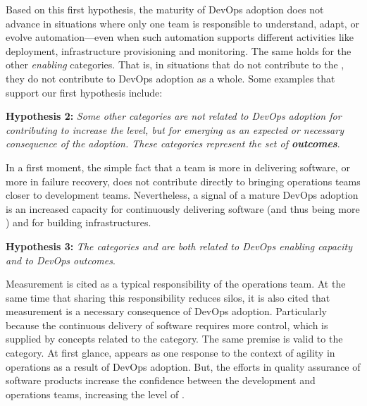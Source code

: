 Based on this first hypothesis, the maturity of DevOps adoption does not
advance in situations where only one team is responsible to understand, adapt, or
evolve automation---even when such automation supports different activities like
deployment, infrastructure provisioning and monitoring. The same holds for the
other \emph{enabling} categories. That is, in situations that
 do not contribute to
the \cc, they do not contribute to DevOps adoption as a whole. Some examples
that support our first hypothesis include:


\begin{mh}
\textbf{Hypothesis 2:} \textit{Some other categories are not related to DevOps
adoption for contributing to increase the} \cc \emph{level, but for emerging
as an expected or necessary consequence of the adoption. These categories
represent the set of \textbf{outcomes}}.
\end{mh}

In a first moment, the simple fact that a team is more
 in delivering software, or more  in failure recovery, does not
contribute directly to bringing operations teams closer to development teams.
Nevertheless, a signal of a mature DevOps adoption is an increased capacity for continuously
delivering software (and thus being more )
and for building  infrastructures.

\begin{mh}
\textbf{Hypothesis 3:} \textit{The categories  and 
are both related to DevOps enabling capacity and to DevOps outcomes}.
\end{mh}

Measurement is cited as a typical responsibility of the operations team.
At the same time that sharing this responsibility reduces silos,
it is also cited that measurement is a necessary consequence of DevOps adoption. Particularly because
the continuous delivery of software requires more control,
which is supplied by concepts related to the  category.
The same premise is valid to the  category. At first glance,
 appears as one response to the context of agility in operations
as a result of DevOps adoption. But, the efforts in quality assurance of software products
increase the confidence between the development and operations teams, increasing the level
of \cc.


